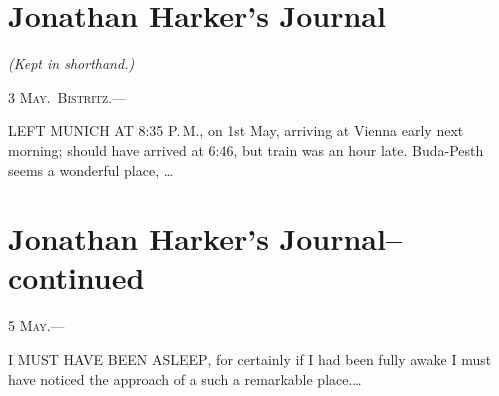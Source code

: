 \documentclass[12pt]{book}
\begin{document}
\chapter{Jonathan Harker's Journal}
\begin{center}\itshape (Kept in shorthand.)\end{center}
\hfill\textsc{3 May.\ Bistritz.—}

\lettrine[lines=3,lhang=0.05,loversize=0.15]{L}{EFT MUNICH AT} 8:35 P.\,M., on 1st May, arriving at Vienna early
next morning; should have arrived at 6:46, but train was an hour late. Buda-Pesth seems a wonderful place, \dots


\chapter{Jonathan Harker's Journal--continued}
\hfill\textsc{5 May.—}

\lettrine[lines=3,lhang=0.05,loversize=0.15]{I}{ MUST HAVE BEEN ASLEEP}, for certainly if I had been fully awake I must have noticed the approach of a such a remarkable place.\dots

%


\end{document}
